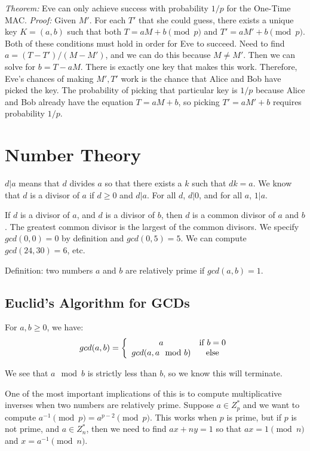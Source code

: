 \documentclass[psamsfonts]{amsart}
\begin{document}
\emph{Theorem:} Eve can only achieve success with probability $1/p$ for the One-Time MAC.
\emph{Proof:} Given $M'$. For each $T'$ that she could guess, there exists a unique key $K=(a,b)$ such that both $T = aM + b \pmod{p}$ and $T' = aM' + b \pmod{p}$. Both of these conditions must hold in order for Eve to succeed. Need to find $a = (T - T')/(M - M')$, and we can do this because $M \neq M'$. Then we can solve for $b = T - a M$. There is exactly one key that makes this work. Therefore, Eve's chances of making $M', T'$ work is the chance that Alice and Bob have picked the key. The probability of picking that particular key is $1/p$ because Alice and Bob already have the equation $T = aM +b$, so picking $T' = a M' +b$ requires probability $1/p$.

\section{Number Theory}

$d | a$ means that $d$ divides $a$ so that there exists a $k$ such that $dk = a$. We know that $d$ is a divisor of $a$ if $d \geq 0$ and $d | a$. For all $d$, $d | 0$, and for all $a$, $1 | a$. 

If $d$ is a divisor of $a$, and $d$ is a divisor of $b$, then $d$ is a common divisor of $a$ and $b$. The greatest common divisor is the largest of the common divisors. We specify $gcd(0,0) = 0$ by definition and $gcd(0, 5) = 5$. We can compute $gcd(24, 30) = 6$, etc.

Definition: two numbers $a$ and $b$ are relatively prime if $gcd(a,b) = 1$. 

\subsection{Euclid's Algorithm for GCDs}

For $a,b \geq 0$, we have:
\begin{eqnarray}
  gcd(a,b) = \left\{\begin{array}{c c}
    a & \text{if } b = 0 \\
    gcd(a, a \mod b) & \text{else}
  \end{array}\right.
\end{eqnarray}

We see that $a \mod b$ is strictly less than $b$, so we know this will terminate. 

One of the most important implications of this is to compute multiplicative inverses when two numbers are relatively prime. Suppose $a \in Z_{p}^*$ and we want to compute $a^{-1} \pmod{p} = a^{p-2} \pmod{p}$. This works when $p$ is prime, but if $p$ is not prime, and $a \in Z_{n}^*$, then we need to find $ax + ny = 1$ so that $ax = 1 \pmod{n}$ and $x = a^{-1} \pmod{n}$. 
\end{document}
